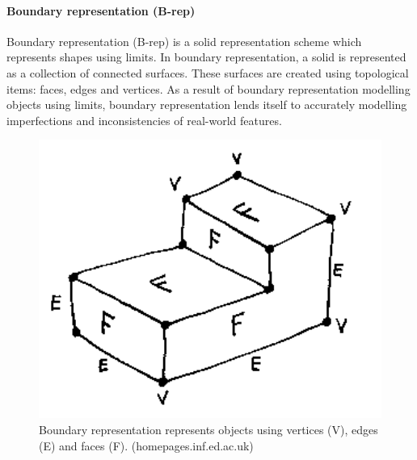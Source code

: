 \documentclass[11pt,a4paper]{report}
\begin{document}
				\paragraph{Boundary representation (B-rep)}
					Boundary representation (B-rep) is a solid representation scheme which represents shapes using limits. In boundary representation, a solid is represented as a collection of connected surfaces. These surfaces are created using topological items: faces, edges and vertices. As a result of boundary representation modelling objects using limits, boundary representation lends itself to accurately modelling imperfections and inconsistencies of real-world features.
					\parencite{hongxin_zhang_introduction_2007}
					\begin{figure}[H]
						\centering
						\includegraphics[width=1\textwidth]{brep}
						\caption[Boundary representation]{Boundary representation represents objects using vertices (V), edges (E) and faces (F). (homepages.inf.ed.ac.uk)}
					\end{figure}
				
\end{document}
